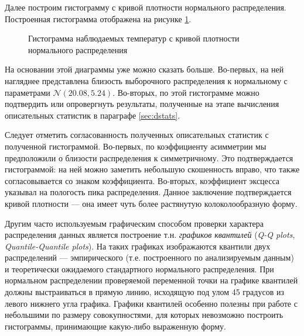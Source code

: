 Далее построим гистограмму с кривой плотности нормального распределения. Построенная гистограмма отображена на рисунке \ref{img:histogram_fitted}.
\begin{figure}[ht]
\caption{Гистограмма наблюдаемых температур с кривой плотности нормального распределения}
\label{img:histogram_fitted}
\end{figure}
На основании этой диаграммы уже можно сказать больше. Во-первых, на ней нагляднее представлена близость выборочного распределения к нормальному с параметрами $\mathcal{N}(20.08, 5.24)$. Во-вторых, по этой гистограмме можно подтвердить или опровергнуть результаты, полученные на этапе вычисления описательных статистик в параграфе \ref{sec:dstats}.

Следует отметить согласованность полученных описательных статистик с полученной гистограммой. Во-первых, по коэффициенту асимметрии мы предположили о близости распределения к симметричному. Это подтверждается гистограммой: на ней можно заметить небольшую скошенность вправо, что также согласовывается со знаком коэффициента. Во-вторых, коэффициент эксцесса указывал на пологость пика распределения. Данное заключение подтверждается кривой плотности --- она имеет чуть более растянутую колоколообразную форму.

Другим часто используемым графическим способом проверки характера распределения данных является построение т.н. \textit{графиков квантилей} (\textit{Q-Q plots}, \textit{Quantile-Quantile plots}). На таких графиках изображаются квантили двух распределений --- эмпирического (т.е. построенного по анализируемым данным) и теоретически ожидаемого стандартного нормального распределения. При нормальном распределении проверяемой переменной точки на графике квантилей должны выстраиваться в прямую линию, исходящую под улом 45 градусов из левого нижнего угла графика. Графики квантилей особенно полезны при работе с небольшими по размеру совокупностями, для которых невозможно построить гистограммы, принимающие какую-либо выраженную форму.


